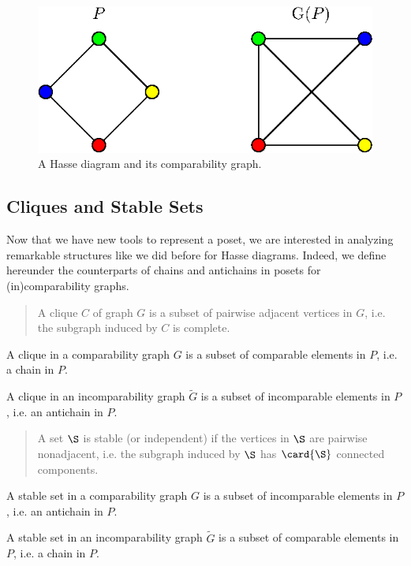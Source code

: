 \begin{figure}
\centering
\includegraphics[height=0.2\textheight]{fig/comp-graph}
\caption{\label{fig:comp-graph} A Hasse diagram and its comparability graph.}
\end{figure}




\subsection*{Cliques and Stable Sets}


Now that we have new tools to represent a poset, we are interested in analyzing
remarkable structures like we did before for Hasse diagrams. Indeed, we define
hereunder the counterparts of chains and antichains in posets for
(in)comparability graphs.

\begin{quotation}
A clique $C$ of graph $G$ is a subset of pairwise adjacent vertices in $G$,
i.e. the subgraph induced by $C$ is complete.
\end{quotation}

A clique in a comparability graph ${G}$ is a subset of comparable  elements in
${P}$, i.e. a chain in ${P}$.

A clique in an incomparability graph $\widetilde{G}$ is a subset of
incomparable  elements in ${P}$, i.e. an antichain in ${P}$.

\begin{quotation}
A set $\S$ is stable (or independent) if the vertices in $\S$ are pairwise
nonadjacent, i.e. the subgraph induced by $\S$ has $\card{\S}$ connected components.
\end{quotation}

A stable set in a comparability graph ${G}$ is a subset of incomparable
elements in ${P}$, i.e. an antichain in ${P}$.

A stable set in an incomparability graph $\widetilde{G}$ is a subset of
comparable elements in ${P}$, i.e. a chain in ${P}$.


